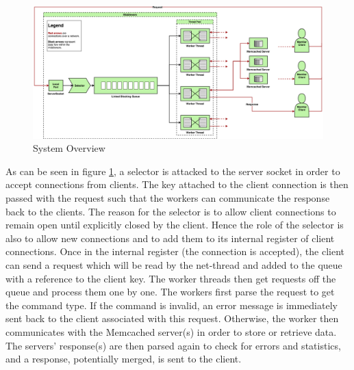 \documentclass[11pt,a4paper]{article}
\begin{document}
\begin{figure}[h]
    \centering
    \includegraphics[width=\textwidth]{processing/graphics/system_overview.png}
    \caption{System Overview}
    \label{png::system_overview}
\end{figure}

As can be seen in figure \ref{png::system_overview}, a selector is attacked to the server socket in order to accept connections from clients. The key attached to the client connection is then passed with the request such that the workers can communicate the response back to the clients. The reason for the selector is to allow client connections to remain open until explicitly closed by the client. Hence the role of the selector is also to allow new connections and to add them to its internal register of client connections. Once in the internal register (the connection is accepted), the client can send a request which will be read by the net-thread and added to the queue with a reference to the client key. The worker threads then get requests off the queue and process them one by one. The workers first parse the request to get the command type. If the command is invalid, an error message is immediately sent back to the client associated with this request. Otherwise, the worker then communicates with the Memcached server(s) in order to store or retrieve data. The servers' response(s) are then parsed again to check for errors and statistics, and a response, potentially merged, is sent to the client.
\end{document}
